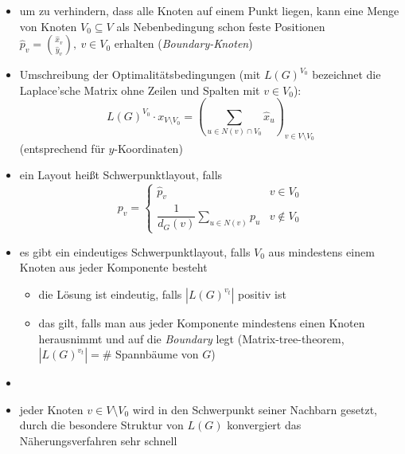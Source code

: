 \topbreak
{}
\vspace*{-0.75\baselineskip}
\begin{itemize}[itemsep=-1pt]
	\item um zu verhindern, dass alle Knoten auf einem Punkt liegen, kann eine Menge von Knoten $V_0\subseteq V$ als Nebenbedingung schon feste Positionen $\hat{p}_v={\hat{x}_v\choose \hat{y}_v},~v\in V_0$ erhalten (\textit{Boundary-Knoten})
	\item Umschreibung der Optimalitätsbedingungen (mit $L(G)^{V_0}$ bezeichnet die Laplace'sche Matrix ohne Zeilen und Spalten mit $v\in V_0$):
		\[L(G)^{V_0}\cdot x_{V\setminus V_0}=\left(\sum\limits_{u\in N(v)\cap V_0}\hat{x}_u\right)_{v\in V\setminus V_0}\]
	(entsprechend für $y$-Koordinaten)
	\item ein Layout heißt Schwerpunktlayout, falls
		\[p_v=\left\{\begin{array}{ll}
			\hat{p}_v&v\in V_0\\
			\dfrac{1}{d_G(v)}\sum\limits_{u\in N(v)}p_u&v\notin V_0
		\end{array}\right.\]
	\item es gibt ein eindeutiges Schwerpunktlayout, falls $V_0$ aus mindestens einem Knoten aus jeder Komponente besteht
		\vspace*{-1.5\baselineskip}
		\ProofIdea
		\begin{itemize}
			\item die Lösung ist eindeutig, falls $|L(G)^{v_t}|$ positiv ist
			\item das gilt, falls man aus jeder Komponente mindestens einen Knoten herausnimmt und auf die \textit{Boundary} legt (Matrix-tree-theorem, $|L(G)^{v_t}|=\#$ Spannbäume von $G$)
		\end{itemize}
	\item \algobreak{}
	\item jeder Knoten $v\in V\setminus V_0$ wird in den Schwerpunkt seiner Nachbarn gesetzt, durch die besondere Struktur von $L(G)$ konvergiert das Näherungsverfahren sehr schnell
\end{itemize}